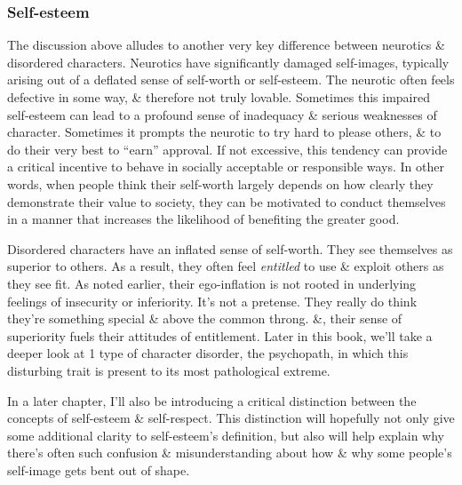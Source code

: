 \documentclass{article}
\numberwithin{equation}{section}
\begin{document}
\subsubsection{Self-esteem}
The discussion above alludes to another very key difference between neurotics \& disordered characters. Neurotics have significantly damaged self-images, typically arising out of a deflated sense of self-worth or self-esteem. The neurotic often feels defective in some way, \& therefore not truly lovable. Sometimes this impaired self-esteem can lead to a profound sense of inadequacy \& serious weaknesses of character. Sometimes it prompts the neurotic to try hard to please others, \& to do their very best to ``earn'' approval. If not excessive, this tendency can provide a critical incentive to behave in socially acceptable or responsible ways. In other words, when people think their self-worth largely depends on how clearly they demonstrate their value to society, they can be motivated to conduct themselves in a manner that increases the likelihood of benefiting the greater good.

Disordered characters have an inflated sense of self-worth. They see themselves as superior to others. As a result, they often feel \textit{entitled} to use \& exploit others as they see fit. As noted earlier, their ego-inflation is not rooted in underlying feelings of insecurity or inferiority. It's not a pretense. They really do think they're something special \& above the common throng. \&, their sense of superiority fuels their attitudes of entitlement. Later in this book, we'll take a deeper look at 1 type of character disorder, the psychopath, in which this disturbing trait is present to its most pathological extreme.

In a later chapter, I'll also be introducing a critical distinction between the concepts of self-esteem \& self-respect. This distinction will hopefully not only give some additional clarity to self-esteem's definition, but also will help explain why there's often such confusion \& misunderstanding about how \& why some people's self-image gets bent out of shape.
\end{document}
